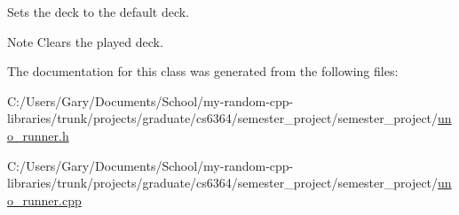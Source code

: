 \-Sets the deck to the default deck. 

\begin{DoxyNote}{\-Note}
\-Clears the played deck. 
\end{DoxyNote}


\-The documentation for this class was generated from the following files\-:\begin{DoxyCompactItemize}
\item 
\-C\-:/\-Users/\-Gary/\-Documents/\-School/my-\/random-\/cpp-\/libraries/trunk/projects/graduate/cs6364/semester\-\_\-project/semester\-\_\-project/\hyperlink{uno__runner_8h}{uno\-\_\-runner.\-h}\item 
\-C\-:/\-Users/\-Gary/\-Documents/\-School/my-\/random-\/cpp-\/libraries/trunk/projects/graduate/cs6364/semester\-\_\-project/semester\-\_\-project/\hyperlink{uno__runner_8cpp}{uno\-\_\-runner.\-cpp}\end{DoxyCompactItemize}
